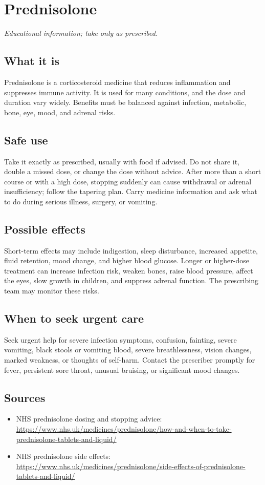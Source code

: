 \chapter{Prednisolone}

\medskip
\noindent\textit{Educational information; take only as prescribed.}

\section*{What it is}
Prednisolone is a corticosteroid medicine that reduces inflammation and suppresses immune activity. It is used for many conditions, and the dose and duration vary widely. Benefits must be balanced against infection, metabolic, bone, eye, mood, and adrenal risks.

\section*{Safe use}
Take it exactly as prescribed, usually with food if advised. Do not share it, double a missed dose, or change the dose without advice. After more than a short course or with a high dose, stopping suddenly can cause withdrawal or adrenal insufficiency; follow the tapering plan. Carry medicine information and ask what to do during serious illness, surgery, or vomiting.

\section*{Possible effects}
Short-term effects may include indigestion, sleep disturbance, increased appetite, fluid retention, mood change, and higher blood glucose. Longer or higher-dose treatment can increase infection risk, weaken bones, raise blood pressure, affect the eyes, slow growth in children, and suppress adrenal function. The prescribing team may monitor these risks.

\section*{When to seek urgent care}
Seek urgent help for severe infection symptoms, confusion, fainting, severe vomiting, black stools or vomiting blood, severe breathlessness, vision changes, marked weakness, or thoughts of self-harm. Contact the prescriber promptly for fever, persistent sore throat, unusual bruising, or significant mood changes.

\section*{Sources}
\begin{itemize}
\item NHS prednisolone dosing and stopping advice: \url{https://www.nhs.uk/medicines/prednisolone/how-and-when-to-take-prednisolone-tablets-and-liquid/}
\item NHS prednisolone side effects: \url{https://www.nhs.uk/medicines/prednisolone/side-effects-of-prednisolone-tablets-and-liquid/}
\end{itemize}
